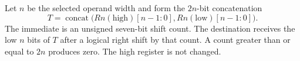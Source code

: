 Let \(n\) be the selected operand width and form the \(2n\)-bit concatenation
\[
  T = \operatorname{concat}\bigl(Rn(\mathrm{high})[n-1:0],
                                Rn(\mathrm{low})[n-1:0]\bigr).
\]
The immediate is an unsigned seven-bit shift count. The destination receives the low \(n\) bits of \(T\) after a logical right shift by that count. A count greater than or equal to \(2n\) produces zero. The high register is not changed.
